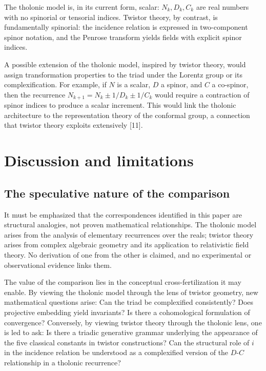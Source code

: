 \documentclass[12pt]{article}
\begin{document}
The tholonic model is, in its current form, scalar: \(N_k, D_k, C_k\)
are real numbers with no spinorial or tensorial indices. Twistor theory,
by contrast, is fundamentally spinorial: the incidence relation is
expressed in two-component spinor notation, and the Penrose transform
yields fields with explicit spinor indices.

A possible extension of the tholonic model, inspired by twistor theory,
would assign transformation properties to the triad under the Lorentz
group or its complexification. For example, if \(N\) is a scalar, \(D\)
a spinor, and \(C\) a co-spinor, then the recurrence
\(N_{k+1} = N_k \pm 1/D_k \pm 1/C_k\) would require a contraction of
spinor indices to produce a scalar increment. This would link the
tholonic architecture to the representation theory of the conformal
group, a connection that twistor theory exploits extensively {[}11{]}.

\section{Discussion and limitations}\label{discussion-and-limitations}

\subsection{The speculative nature of the comparison}\label{the-speculative-nature-of-the-comparison}

It must be emphasized that the correspondences identified in this paper
are structural analogies, not proven mathematical relationships. The
tholonic model arises from the analysis of elementary recurrences over
the reals; twistor theory arises from complex algebraic geometry and its
application to relativistic field theory. No derivation of one from the
other is claimed, and no experimental or observational evidence links
them.

The value of the comparison lies in the conceptual cross-fertilization
it may enable. By viewing the tholonic model through the lens of twistor
geometry, new mathematical questions arise: Can the triad be
complexified consistently? Does projective embedding yield invariants?
Is there a cohomological formulation of convergence? Conversely, by
viewing twistor theory through the tholonic lens, one is led to ask: Is
there a triadic generative grammar underlying the appearance of the five
classical constants in twistor constructions? Can the structural role of
\(i\) in the incidence relation be understood as a complexified version
of the \(D\)-\(C\) relationship in a tholonic recurrence?
\end{document}
